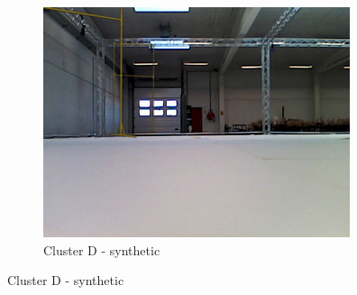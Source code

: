 \begin{figure}[h!]
\begin{subfigure}{0.29\textwidth}
      \includegraphics[width=\textwidth]{figure/tsne_random/D/4.png}
      \caption{Cluster D - synthetic}
   \end{subfigure}


\end{figure}
